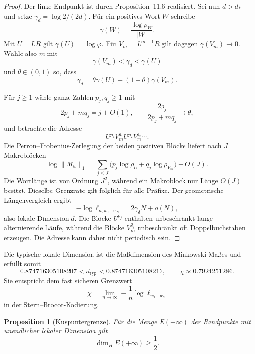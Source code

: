 \documentclass[11pt,a4paper]{article}
\newcommand{\Haus}{\operatorname{dim}_{H}}
\newtheorem{proposition}[remark]{Proposition}
\begin{document}
\begin{proof}
Der linke Endpunkt ist durch Proposition~11.6 realisiert. Sei nun
$d>d_*$ und setze $\gamma_d=\log2/(2d)$. Für ein positives Wort $W$
schreibe
\[
 \gamma(W)=\frac{\log\rho_W}{|W|}.
\]
Mit $U=LR$ gilt $\gamma(U)=\log\varphi$. Für
$V_m=L^{m-1}R$ gilt dagegen $\gamma(V_m)\to0$. Wähle also $m$ mit
\[
 \gamma(V_m)<\gamma_d<\gamma(U)
\]
und $\theta\in(0,1)$ so, dass
\[
 \gamma_d=\theta\gamma(U)+(1-\theta)\gamma(V_m).
\]

Für $j\ge1$ wähle ganze Zahlen $p_j,q_j\ge1$ mit
\[
 2p_j+m q_j=j+O(1),
 \qquad
 \frac{2p_j}{2p_j+m q_j}\longrightarrow\theta,
\]
und betrachte die Adresse
\[
 U^{p_1}V_m^{q_1}U^{p_2}V_m^{q_2}\cdots.
\]
Die Perron--Frobenius-Zerlegung der beiden positiven Blöcke liefert nach
$J$ Makroblöcken
\[
 \log\|M_w\|_1
 =\sum_{j\le J}\bigl(p_j\log\rho_U+q_j\log\rho_{V_m}\bigr)+O(J).
\]
Die Wortlänge ist von Ordnung $J^2$, während ein Makroblock nur Länge
$O(J)$ besitzt. Dieselbe Grenzrate gilt folglich für alle Präfixe. Der
geometrische Längenvergleich ergibt
\[
 -\log\ell_{n,w_1\cdots w_N}=2\gamma_dN+o(N),
\]
also lokale Dimension $d$. Die Blöcke $U^{p_j}$ enthalten unbeschränkt
lange alternierende Läufe, während die Blöcke $V_m^{q_j}$ unbeschränkt
oft Doppelbuchstaben erzeugen. Die Adresse kann daher nicht periodisch
sein.
\end{proof}

Die typische lokale Dimension ist die Maßdimension des Minkowski-Maßes und
erfüllt somit
\[
 0.874716305108207<d_{\mathrm{typ}}<0.874716305108213,
 \qquad \chi\approx0.7924251286.
\]
Sie entspricht dem fast sicheren Grenzwert
\[
 \chi=\lim_{n\to\infty}-\frac1n\log\ell_{w_1\cdots w_n}
\]
in der Stern--Brocot-Kodierung.

\begin{proposition}[Kuspuntergrenze]
Für die Menge $E(+\infty)$ der Randpunkte mit unendlicher lokaler
Dimension gilt
\[
 \Haus E(+\infty)\ge\frac12.
\]
\end{proposition}
\end{document}
